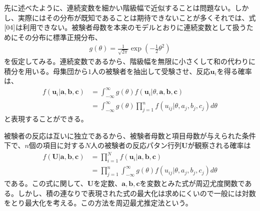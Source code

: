 \documentclass[12pt]{jarticle}
\begin{document}
先に述べたように、連続変数を細かい階級幅で近似することは問題ない。しかし、実際にはその分布が既知であることは期待できないことが多くそれでは、式$\ref{04}$は利用できない。被験者母数を本来のモデルとおりに連続変数として扱うためにその分布に標準正規分布、
\begin{align}
  \label{05}
  \displaystyle g(\theta) = \frac{1}{\sqrt{2\pi}}\exp(-\frac{1}{2}\theta^2)   \tag{4.21}
\end{align}
を仮定してみる。連続変数であるから、階級幅を無限に小さくして和の代わりに積分を用いる。母集団から$1$人の被験者を抽出して受験させ、反応$\boldsymbol{u}_i$を得る確率は、
\begin{align}
  \label{06}
  \displaystyle f(\boldsymbol{u}_i|\boldsymbol{a,b,c}) &= \int_{-\infty}^{\infty} g(\theta)f(\boldsymbol{u}_i|\theta,\boldsymbol{a,b,c})   \tag{4.22} \\
  &= \int_{-\infty}^{\infty} g(\theta) \prod_{j = 1}^{n} f(u_{ij}|\theta,a_j,b_j,c_j) d\theta \tag{4.23}
\end{align}
と表現することができる。

被験者の反応は互いに独立であるから、被験者母数と項目母数が与えられた条件下で、$n$個の項目に対する$N$人の被験者の反応パタン行列$\boldsymbol{U}$が観察される確率は
\begin{align}
  \label{07}
  \displaystyle f(\boldsymbol{U}|\boldsymbol{a,b,c}) &= \prod_{i = 1}^{N} f(\boldsymbol{u}_i|\boldsymbol{a,b,c})   \tag{4.22} \\
  &= \prod_{j = 1}^{n}  \int_{-\infty}^{\infty} g(\theta)  f(u_{ij}|\theta,a_j,b_j,c_j) d\theta \tag{4.23}
\end{align}
である。この式に関して、$\boldsymbol{U}$を定数、$\boldsymbol{a,b,c}$を変数とみた式が周辺尤度関数である。しかし、積の連なりで表現された式の最大化は求めにくいので一般には対数をとり最大化を考える。この方法を周辺最尤推定法という。
\end{document}
